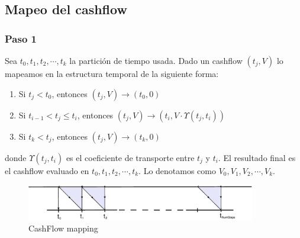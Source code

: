
\subsection{Mapeo del cashflow}

\subsubsection{Paso 1}

Sea $t_0, t_1, t_2, \cdots, t_k$ la partici\'on de tiempo usada.
Dado un cashflow $(t_j,V)$ lo mapeamos en la estructura
temporal de la siguiente forma:

\begin{enumerate}
\item Si $t_j < t_0$, entonces $(t_j,V) \longrightarrow (t_0,0)$
\item Si $t_{i-1} < t_j \leq t_i$, entonces $(t_j,V) \longrightarrow (t_i,V \cdot \Upsilon(t_j,t_i))$
\item Si $t_k < t_j$, entonces $(t_j,V) \longrightarrow (t_k,0)$
\end{enumerate}

donde $\Upsilon(t_j,t_i)$ es el coeficiente de transporte entre $t_j$ y $t_i$.
El resultado final es el cashflow evaluado en $t_0, t_1, t_2, \cdots, t_k$.
Lo denotamos como $V_0, V_1, V_2, \cdots, V_k$.

\begin{figure}[!hb]
\begin{center}
\includegraphics[width=10cm,angle=0]{./images/cashflowmapping.eps}
\caption{CashFlow mapping}
\label{timetranches}
\end{center}
\end{figure}

